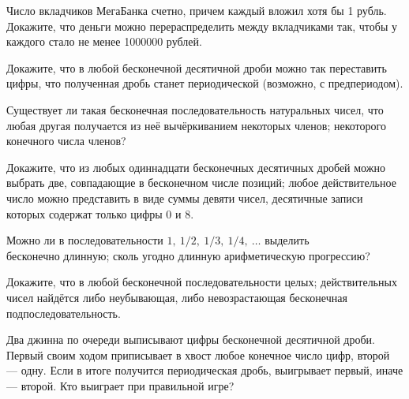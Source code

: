 \documentclass[a4paper,11pt]{article}
\begin{document}

Число вкладчиков МегаБанка счетно, причем каждый вложил хотя бы 1 рубль.
Докажите, что деньги можно перераспределить между вкладчиками так,
чтобы у каждого стало не менее 1000000 рублей.






Докажите, что в любой бесконечной десятичной дроби можно так переставить
цифры, что полученная дробь станет периодической
(возможно, с предпериодом).

Существует ли такая бесконечная последовательность натуральных чисел,
что любая другая получается из не\"е выч\"еркиванием
 некоторых членов;
 некоторого конечного числа членов?




Докажите, что
из любых одиннадцати бесконечных десятичных дробей можно
выбрать две, совпадающие в бесконечном числе позиций;
 любое действительное число можно представить в виде
суммы девяти чисел, десятичные записи которых содержат только цифры 0 и 8.


 Можно ли в последовательности
$1, \ 1/2, \ 1/3, \ 1/4, \ \dots$
выделить\\
  бесконечно длинную;  сколь угодно длинную
арифметическую прогрессию?


Докажите, что в любой бесконечной последовательности
 целых;
 действительных чисел найдётся
либо неубывающая,
либо невозрастающая бесконечная подпоследовательность.

 Два джинна по очереди выписывают цифры бесконечной
десятичной дроби. Первый своим ходом приписывает в хвост любое
конечное число цифр, второй --- одну. Если в итоге получится
периодическая дробь,  выигрывает первый, иначе --- второй. Кто
выиграет при правильной игре? %
\end{document}
